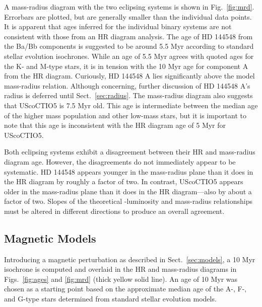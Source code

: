 \documentclass{aa}
\begin{document}
A mass-radius diagram with the two eclipsing systems is shown in Fig.~\ref{fig:mrd}. Errorbars are plotted, but are generally smaller than the individual data points. It is apparent that ages inferred for the individual binary systems are not consistent with those from an HR diagram analysis. The age of HD 144548 from the Ba/Bb components is suggested to be around 5.5 Myr according to standard stellar evolution isochrones. While an age of 5.5 Myr agrees with quoted ages for the K- and M-type stars, it is in tension with the 10 Myr age for component A from the HR diagram. Curiously, HD 144548 A lies significantly above the model mass-radius relation. Although concerning, further discussion of HD 144548 A's radius is deferred until Sect.~\ref{sec:radius}. The mass-radius diagram also suggests that UScoCTIO5 is 7.5 Myr old. This age is intermediate between the median age of the higher mass population and other low-mass stars, but it is important to note that this age is inconsistent with the HR diagram age of 5 Myr for UScoCTIO5. 

Both eclipsing systems exhibit a disagreement between their HR and mass-radius diagram age. However, the disagreements do not immediately appear to be systematic. HD 144548 appears younger in the mass-radius plane than it does in the HR diagram by roughly a factor of two. In contrast, UScoCTIO5 appears older in the mass-radius plane than it does in the HR diagram---also by about a factor of two. Slopes of the theoretical \teff-luminosity and mass-radius relationships must be altered in different directions to produce an overall agreement.

\subsection{Magnetic Models}
Introducing a magnetic perturbation as described in Sect.~\ref{sec:models}, a 10 Myr isochrone is computed and overlaid in the HR and mass-radius diagrams in Figs.~\ref{fig:ages} and \ref{fig:mrd} (thick yellow solid line). An age of 10 Myr was chosen as a starting point based on the approximate median age of the A-, F-, and G-type stars determined from standard stellar evolution models. 
\end{document}
